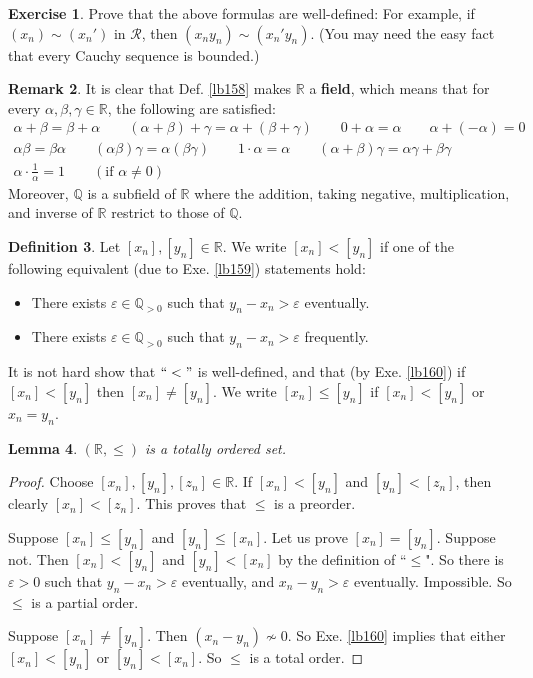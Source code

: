 \documentclass[12pt,b5paper,notitlepage]{article}
\theoremstyle{definition}
\newtheorem{df}{Definition}[section]
\newtheorem{exe}[df]{Exercise}
\newtheorem{rem}[df]{Remark}
\theoremstyle{plain}
\newtheorem{lm}[df]{Lemma}
\newcommand{\scr}{\mathscr}
\newcommand{\Qbb}{\mathbb Q}
\newcommand{\Rbb}{\mathbb R}
\newcommand{\eps}{\varepsilon}
\numberwithin{equation}{section}
\begin{document}
\begin{exe}
Prove that the above formulas are well-defined: For example, if $(x_n)\sim(x_n')$ in $\scr R$, then $(x_ny_n)\sim (x_n'y_n)$. (You may need the easy fact that every Cauchy sequence is bounded.)
\end{exe}

\begin{rem}\label{lb166}
It is clear that Def. \ref{lb158} makes $\Rbb$ a \textbf{field},  which means that for every $\alpha,\beta,\gamma\in\Rbb$, the following are satisfied:
\begin{gather*}
\alpha+\beta=\beta+\alpha\qquad  (\alpha+\beta)+\gamma=\alpha+(\beta+\gamma)\qquad 0+\alpha=\alpha\qquad \alpha+(-\alpha)=0\\
\alpha\beta=\beta\alpha\qquad (\alpha\beta)\gamma=\alpha(\beta\gamma)\qquad 1\cdot\alpha=\alpha\qquad(\alpha+\beta)\gamma=\alpha\gamma+\beta\gamma\\
\alpha\cdot \frac 1\alpha=1\qquad(\text{if }\alpha\neq0)
\end{gather*}
Moreover, $\Qbb$ is a subfield of $\Rbb$ where the addition, taking negative, multiplication, and inverse of $\Rbb$ restrict to those of $\Qbb$.
\end{rem}

\begin{df}\label{lb164}
Let $[x_n],[y_n]\in\Rbb$. We write $[x_n]<[y_n]$ if one of the following equivalent (due to Exe. \ref{lb159}) statements hold:
\begin{itemize}
\item There exists $\eps\in\Qbb_{>0}$ such that $y_n-x_n>\eps$ eventually. 
\item There exists $\eps\in\Qbb_{>0}$ such that $y_n-x_n>\eps$ frequently. 
\end{itemize}
It is not hard show that $``<"$ is well-defined, and that (by Exe. \ref{lb160}) if $[x_n]<[y_n]$ then $[x_n]\neq [y_n]$. We write $[x_n]\leq [y_n]$ if $[x_n]<[y_n]$ or $x_n=y_n$.
\end{df}

\begin{lm}
$(\Rbb,\leq)$ is a totally ordered set.
\end{lm}

\begin{proof}
Choose $[x_n],[y_n],[z_n]\in\Rbb$. If $[x_n]<[y_n]$ and $[y_n]<[z_n]$, then clearly $[x_n]<[z_n]$. This proves that $\leq$ is a preorder. 

Suppose $[x_n]\leq[y_n]$ and $[y_n]\leq[x_n]$. Let us prove $[x_n]=[y_n]$. Suppose not. Then $[x_n]<[y_n]$ and $[y_n]<[x_n]$ by the definition of ``$\leq$". So there is $\eps>0$ such that $y_n-x_n>\eps$ eventually, and $x_n-y_n>\eps$ eventually. Impossible. So $\leq$ is a partial order.

Suppose $[x_n]\neq [y_n]$. Then $(x_n-y_n)\nsim 0$. So Exe. \ref{lb160} implies that either $[x_n]<[y_n]$ or $[y_n]<[x_n]$. So $\leq$ is a total order.
\end{proof}
\end{document}
